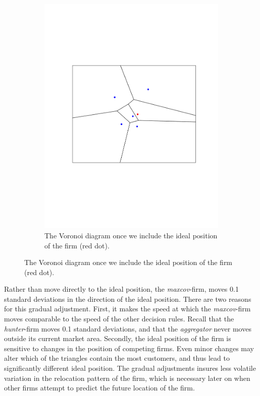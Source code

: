 \documentclass[preprint, 12pt]{elsarticle}
\begin{document}
\begin{figure}
\begin{subfigure}[t]{0.31\textwidth}
		\includegraphics[width=\textwidth, trim={34mm 76mm 28mm 76mm}]{Graphics/maxcov_c_voronoi.pdf}
		\caption{The Voronoi diagram once we include the ideal position of the firm (red dot).}
		\label{fig:maxcov_voronoi_incr}
	\end{subfigure}
	\label{fig:maxcov}
\end{figure}

Rather than move directly to the ideal position, the \emph{maxcov}-firm, moves 0.1 standard deviations in the direction of the ideal position. There are two reasons for this gradual adjustment. First, it makes the speed at which the \emph{maxcov}-firm moves comparable to the speed of the other decision rules. Recall that the \emph{hunter}-firm moves 0.1 standard deviations, and that the \emph{aggregator} never moves outside its current market area. Secondly, the ideal position of the firm is sensitive to changes in the position of competing firms. Even minor changes may alter which of the triangles contain the most customers, and thus lead to significantly different ideal position. The gradual adjustments insures less volatile variation in the relocation pattern of the firm, which is necessary later on when other firms attempt to predict the future location of the firm.
\end{document}
